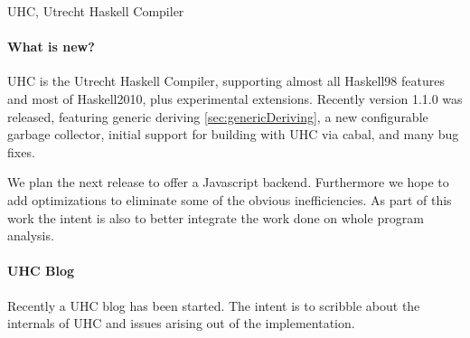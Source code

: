 \begin{hcarentry}{UHC, Utrecht Haskell Compiler}
\label{uhc}
\label{ehc}
\makeheader

\paragraph{What is new?}
UHC is the Utrecht Haskell Compiler, supporting almost all Haskell98 features and most of Haskell2010, plus
experimental extensions.
Recently version 1.1.0 was released, featuring generic deriving \cref{sec:genericDeriving},
a new configurable garbage collector, initial support for building with UHC via cabal, and many bug fixes.

We plan the next release to offer a Javascript backend.
Furthermore we hope to add optimizations to eliminate some of the obvious inefficiencies.
As part of this work the intent is also to better integrate the work done on whole program analysis.

\paragraph{UHC Blog}
Recently a UHC blog has been started.
The intent is to scribble about the internals of UHC and issues arising out of the implementation.


\end{hcarentry}
